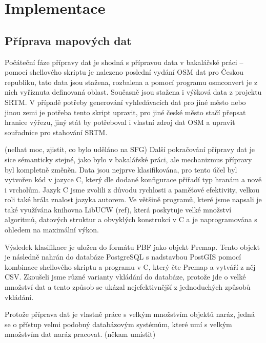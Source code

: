 \chapter{Implementace}
\section{Příprava mapových dat}
Počáteční fáze přípravy dat je shodná s přípravou data v bakalářské práci -- pomocí shellového skriptu je nalezeno poslední vydání OSM dat pro Českou republiku, tato data jsou stažena, rozbalena a pomocí programu osmconvert je z nich vyříznuta definovaná oblast. Současně jsou stažena i výšková data z projektu SRTM. V případě potřeby generování vyhledávacích dat pro jiné město nebo jinou zemi je potřeba tento skript upravit, pro jiné české město stačí přepsat hranice výřezu, jiný stát by potřeboval i vlastní zdroj dat OSM a upravit souřadnice pro stahování SRTM. 

(\TODO nelhat moc, zjistit, co bylo uděláno na SFG) Další pokračování přípravy dat je sice sémanticky stejné, jako bylo v bakalářské práci, ale mechanizmus přípravy byl kompletně změněn. Data jsou nejprve klasifikována, pro tento účel byl vytvořen kód v jazyce C, který dle dodané konfigurace přiřadí typ hranám a nově i vrcholům. Jazyk C jsme zvolili z důvodu rychlosti a paměťové efektivity, velkou roli také hrála znalost jazyka autorem. Ve většině programů, které jsme napsali je také využívána knihovna LibUCW (\TODO ref), která poskytuje velké množství algoritmů, datových struktur a obvyklých konstrukcí v C a je naprogramována s ohledem na maximální výkon.

Výsledek klasifikace je uložen do formátu PBF jako objekt Premap. Tento objekt je následně nahrán do databáze PostgreSQL s nadstavbou PostGIS pomocí kombinace shellového skriptu a programu v C, který čte Premap a vytváří z něj CSV. Zkoušeli jsme různé varianty vkládání do databáze, protože jde o velké množství dat a tento způsob se ukázal nejefektivnější z jednoduchých způsobů vkládání. 

Protože příprava dat je vlastně práce s velkým množstvím objektů naráz, jedná se o přístup velmi podobný databázovým systémům, které umí s velkým množstvím dat naráz pracovat. (\TODO někam umístit) 

